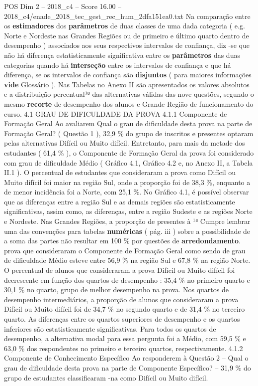 \begin{textsample}{POS Dim 2 – 2018\_c4 – Score 16.00 – 2018\_c4/enade\_2018\_tec\_gest\_rec\_hum\_2dfa151ea0.txt}
Na comparação entre os \textbf{estimadores} dos \textbf{parâmetros} de duas classes de uma dada categoria ( e.g.
Norte e Nordeste nas Grandes Regiões ou de primeiro e último quarto dentro de desempenho ) associados aos seus respectivos intervalos de confiança, diz -se que não há diferença estatisticamente significativa entre os \textbf{parâmetros} das duas categorias quando há \textbf{interseção} entre os intervalos de confiança e que há diferença, se os intervalos de confiança são \textbf{disjuntos} ( para maiores informações \textbf{vide} Glossário ).
Nas Tabelas no Anexo II são apresentados os valores absolutos e a distribuição percentual¹⁸ das alternativas válidas das nove questões, segundo o mesmo \textbf{recorte} de desempenho dos alunos e Grande Região de funcionamento do curso. 4.1 GRAU DE DIFICULDADE DA PROVA 4.1.1 Componente de Formação Geral Ao avaliarem Qual o grau de dificuldade desta prova na parte de Formação Geral? ( Questão 1 ), 32,9 \% do grupo de inscritos e presentes optaram pelas alternativas Difícil ou Muito difícil.
Entretanto, para mais da metade dos estudantes ( 61,4 \% ), o Componente de Formação Geral da prova foi considerado com grau de dificuldade Médio ( Gráfico 4.1, Gráfico 4.2 e, no Anexo II, a Tabela II.1 ).
O percentual de estudantes que consideraram a prova como Difícil ou Muito difícil foi maior na região Sul, onde a proporção foi de 38,3 \%, enquanto a de menor incidência foi a Norte, com 25,1 \%.
No Gráfico 4.1, é possível observar que as diferenças entre a região Sul e as demais regiões são estatisticamente significativas, assim como, as diferenças, entre a região Sudeste e as regiões Norte e Nordeste.
Nas Grandes Regiões, a proporção de presentes à ¹⁸ Cumpre lembrar uma das convenções para tabelas \textbf{numéricas} ( pág. iii ) sobre a possibilidade de a soma das partes não resultar em 100 \% por questões de \textbf{arredondamento}. prova que consideraram o Componente de Formação Geral como sendo de grau de dificuldade Médio esteve entre 56,9 \% na região Sul e 67,8 \% na região Norte.
O percentual de alunos que consideraram a prova Difícil ou Muito difícil foi decrescente em função dos quartos de desempenho : 35,4 \% no primeiro quarto e 30,1 \% no quarto, grupo de melhor desempenho na prova.
Nos quartos de desempenho intermediários, a proporção de alunos que consideraram a prova Difícil ou Muito difícil foi de 34,7 \% no segundo quarto e de 31,4 \% no terceiro quarto.
As diferenças entre os quartos superiores de desempenho e os quartos inferiores são estatisticamente significativas.
Para todos os quartos de desempenho, a alternativa modal para essa pergunta foi a Médio, com 59,5 \% e 63,0 \% dos respondentes no primeiro e terceiro quartos, respectivamente. 4.1.2 Componente de Conhecimento Específico Ao responderem à Questão 2 – Qual o grau de dificuldade desta prova na parte de Componente Específico? – 31,9 \% do grupo de estudantes classificaram -na como Difícil ou Muito difícil.

\end{textsample}
